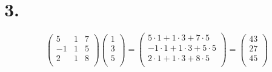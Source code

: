 \documentclass[12pt]{article}
\begin{document}
\section*{3.}
\begin{equation*}
	\begin{pmatrix}
		5 & 1 & 7 \\
		-1 & 1 & 5 \\
		2 & 1 & 8 \\
	\end{pmatrix}
	\begin{pmatrix}
		1 \\
		3 \\
		5 \\
	\end{pmatrix}
	=
	\begin{pmatrix}
		5 \cdot 1 + 1 \cdot 3 + 7 \cdot 5 \\
		-1 \cdot 1 + 1 \cdot 3 + 5 \cdot 5 \\
		2 \cdot 1 + 1 \cdot 3 + 8 \cdot 5 \\
	\end{pmatrix}
	=
	\boxed{
		\begin{pmatrix}
			43 \\
			27 \\
			45 \\
		\end{pmatrix}
	}
\end{equation*}
\end{document}
